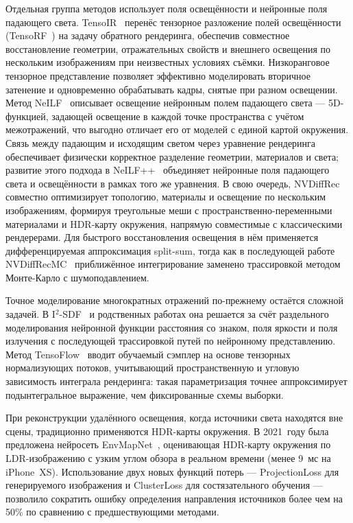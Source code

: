 Отдельная группа методов использует поля освещённости и нейронные поля падающего
света. TensoIR~\cite{Jin2023TensoIR} перенёс тензорное разложение полей
освещённости (TensoRF~\cite{Chen2022ECCV}) на задачу обратного рендеринга,
обеспечив совместное восстановление геометрии, отражательных свойств и внешнего
освещения по нескольким изображениям при неизвестных условиях съёмки.
Низкоранговое тензорное представление позволяет эффективно моделировать
вторичное затенение и одновременно обрабатывать кадры, снятые при разном
освещении. Метод NeILF~\cite{yao2022neilf} описывает освещение нейронным полем
падающего света --- 5D-функцией, задающей освещение в каждой точке пространства
с учётом межотражений, что выгодно отличает его от моделей с единой картой
окружения. Связь между падающим и исходящим светом через уравнение рендеринга
обеспечивает физически корректное разделение геометрии, материалов и света;
развитие этого подхода в NeILF++~\cite{zhang2023neilfpp} объединяет нейронные
поля падающего света и освещённости в рамках того же уравнения. В свою очередь,
NVDiffRec~\cite{NVDiffRec} совместно оптимизирует топологию, материалы и
освещение по нескольким изображениям, формируя треугольные меши с
пространственно-переменными материалами и HDR-карту окружения, напрямую
совместимые с классическими рендерерами. Для быстрого восстановления освещения в
нём применяется дифференцируемая аппроксимация split-sum, тогда как в
последующей работе NVDiffRecMC~\cite{NVDiffRecMC} приближённое интегрирование
заменено трассировкой методом Монте-Карло с шумоподавлением.

Точное моделирование многократных отражений по-прежнему остаётся сложной
задачей. В I$^{2}$-SDF~\cite{zhu2023i2} и родственных работах она решается за
счёт раздельного моделирования нейронной функции расстояния со знаком, поля
яркости и поля излучения с последующей трассировкой путей по нейронному
представлению. Метод TensoFlow~\cite{gu2025tensoflow} вводит обучаемый
сэмплер на основе тензорных нормализующих потоков, учитывающий пространственную
и угловую зависимость интеграла рендеринга: такая параметризация точнее
аппроксимирует подынтегральное выражение, чем фиксированные схемы выборки.

При реконструкции удалённого освещения, когда источники света находятся вне
сцены, традиционно применяются HDR-карты окружения. В 2021~году была предложена
нейросеть EnvMapNet~\cite{HDR_EM_estim}, оценивающая HDR-карту окружения по
LDR-изображению с узким углом обзора в реальном времени (менее 9~мс на
iPhone~XS). Использование двух новых функций потерь --- ProjectionLoss для
генерируемого изображения и ClusterLoss для состязательного обучения ---
позволило сократить ошибку определения направления источников более чем на
50\% по сравнению с предшествующими методами.

